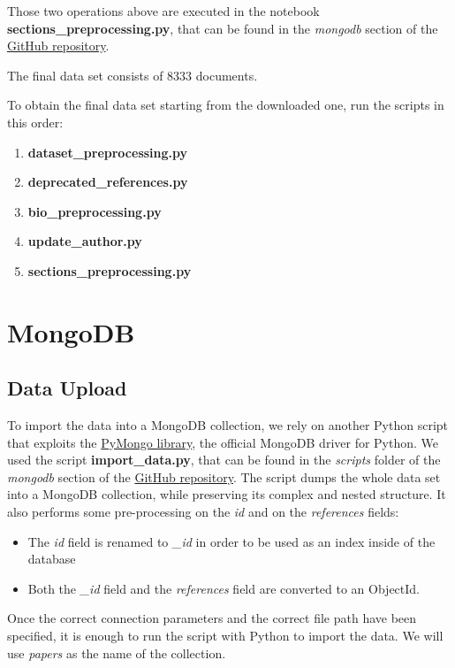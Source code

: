 \documentclass{Configuration_Files/PoliMi3i_thesis}
\begin{document}
Those two operations above are executed in the notebook \textbf{sections\_preprocessing.py}, that can be found in the \textit{mongodb} section of the \href{https://github.com/albertopirillo/smbud-project-2022}{GitHub repository}. 

The final data set consists of 8333 documents. 

To obtain the final data set starting from the downloaded one, run the scripts in this order:
\begin{enumerate} 
    \item \textbf{dataset\_preprocessing.py}
    \item \textbf{deprecated\_references.py}
    \item \textbf{bio\_preprocessing.py}
    \item \textbf{update\_author.py}
    \item \textbf{sections\_preprocessing.py}
\end{enumerate}

\pagebreak
\section{MongoDB}
\label{ch:mongo}
\subsection{Data Upload}
To import the data into a MongoDB collection, we rely on another Python script that exploits the \href{https://www.mongodb.com/docs/drivers/pymongo/}{PyMongo library}, the official MongoDB driver for Python.
We used the script \textbf{import\_data.py}, that can be found in the \textit{scripts} folder of the \textit{mongodb} section of the \href{https://github.com/albertopirillo/smbud-project-2022}{GitHub repository}. The script dumps the whole data set into a MongoDB collection, while preserving its complex and nested structure. It also performs some pre-processing on the \textit{id} and on the \textit{references} fields:
\begin{itemize}
    \item The \textit{id} field is renamed to \textit{\_id} in order to be used as an index inside of the database
    \item Both the \textit{\_id} field and the \textit{references} field are converted to an ObjectId.
\end{itemize}
Once the correct connection parameters and the correct file path have been specified, it is enough to run the script with Python to import the data. We will use \textit{papers} as the name of the collection.
\end{document}

